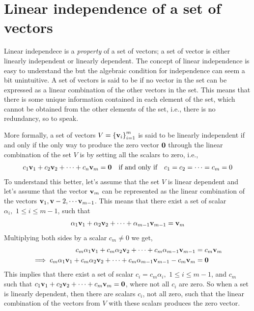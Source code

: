 \section{Linear independence of a set of vectors}
Linear independece is a \textit{property} of a set of vectors; a set of vector is either linearly independent or linearly dependent. The concept of linear independence is easy to understand the but the algebraic condition for independence can seem a bit unintuitive. A set of vectors is said to be  if no vector in the set can be expressed as a linear combination of the other vectors in the set. This means that there is some unique  information contained in each element of the set, which cannot be obtained from the other elements of the set, i.e., there is no redundancy, so to speak. 

More formally, a set of vectors $V = \left\{ \mathbf{v}_i \right\}_{i=1}^{m}$ is said to be linearly independent if and only if the only way to produce the zero vector $\mathbf{0}$ through the linear combination of the set $V$ is by setting all the scalars to zero, i.e.,
\begin{equation}
    c_1 \mathbf{v}_1 + c_2 \mathbf{v}_2 + \cdots + c_n \mathbf{v}_m = \mathbf{0} \quad \text{if and only if} \quad c_1 = c_2 = \cdots = c_m = 0
    \label{eq:linear-indep}
\end{equation}
To understand this better, let's assume that the set $V$ is linear dependent and let's assume that the vector $\mathbf{v}_m$ can be represented as the linear combination of the vectors $\mathbf{v}_1, \mathbf{v}-2, \cdots \mathbf{v}_{m-1}$. This means that there exist a set of scalar $\alpha_i, \,\, 1 \leq i \leq m-1$, such that
\[ \alpha_1 \mathbf{v}_1 + \alpha_2 \mathbf{v}_2 + \cdots + \alpha_{m-1}\mathbf{v}_{m-1} = \mathbf{v}_m \]
Multiplying both sides by a scalar $c_m \neq 0$ we get,
\[ \begin{split}
    c_m\alpha_1 \mathbf{v}_1 + c_m\alpha_2 \mathbf{v}_2 + \cdots + c_m\alpha_{m-1}\mathbf{v}_{m-1} &= c_m\mathbf{v}_m \\
    \implies c_m\alpha_1 \mathbf{v}_1 + c_m\alpha_2 \mathbf{v}_2 + \cdots + c_m\alpha_{m-1}\mathbf{v}_{m-1} - c_m\mathbf{v}_m &= \mathbf{0}
\end{split} \]
This implies that there exist a set of scalar $c_i = c_m\alpha_i, \,\, 1 \leq i \leq m-1$, and $c_m$ such that $c_1 \mathbf{v}_1 + c_2 \mathbf{v}_2 + \cdots + c_m \mathbf{v}_m = \mathbf{0}$, where not all $c_i$ are zero. So when a set is linearly dependent, then there are scalars $c_i$, not all zero, such that the linear combination of the vectors from $V$ with these scalars produces the zero vector.


